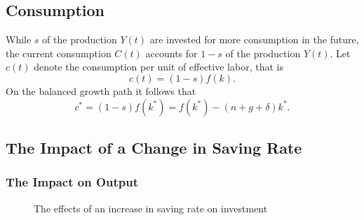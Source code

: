 \documentclass[12pt]{article} %
\begin{document}
\subsection{Consumption}
While $s$ of the production $Y(t)$ are invested for more consumption in the future, the current consumption $C(t)$ accounts for $1-s$ of the production $Y(t)$. Let $c(t)$ denote the consumption per unit of effective labor, that  is
\[
c(t)=(1-s)f(k).
\]
On the balanced growth path it follows that
\[
c^*=(1-s)f(k^*)=f(k^*)-(n+g+\delta)k^*.
\] 

\subsection{The Impact of a Change in Saving Rate}
\subsubsection{The Impact on Output}
\begin{figure}[H] %
	\caption{\small The effects of an increase in saving rate on investment}
	\label{fig:speciation}
\end{figure}
\end{document}
